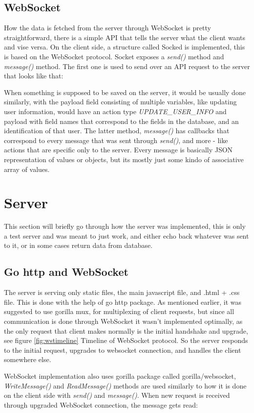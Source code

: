 \subsection{WebSocket}\label{sec:websocket}
How the data is fetched from the server through WebSocket is pretty straightforward, there is a simple API that tells the server what the client wants and vise versa. On the client side, a structure called Socked is implemented, this is based on the WebSocket protocol. Socket exposes a \emph{send()} method and \emph{message()} method. The first one is used to send over an API request to the server that looks like that:

When something is supposed to be saved on the server, it would be usually done similarly, with the payload field consisting of multiple variables, like updating user information, would have an action type \emph{UPDATE\_USER\_INFO} and payload with field names that correspond to the fields in the database, and an identification of that user. The latter method, \emph{message()} has callbacks that correspond to every message that was sent through \emph{send()}, and more - like actions that are specific only to the server. Every message is basically JSON representation of values or objects, but its mostly just some kindo of associative array of values.

\section{Server}
This section will briefly go through how the server was implemented, this is only a test server and was meant to just work, and either echo back whatever was sent to it, or in some cases return data from database.
\subsection{Go http and WebSocket}
The server is serving only static files, the main javascript file, and .html + .css file. This is done with the help of go http package. As mentioned earlier, it was suggested to use gorilla mux, for multiplexing of client requests, but since all communication is done through WebSocket it wasn't implemented optimally, as the only request that client makes normally is the initial handshake and upgrade, see figure \ref{fig:wstimeline} Timeline of WebSocket protocol. So the server responds to the initial request, upgrades to websocket connection, and handles the client somewhere else.

WebSocket implementation also uses gorilla package called gorilla/websocket, \emph{WriteMessage()} and \emph{ReadMessage()} methods are used similarly to how it is done on the client side with \emph{send()} and \emph{message()}. When new request is received through upgraded WebSocket connection, the message gets read: 


